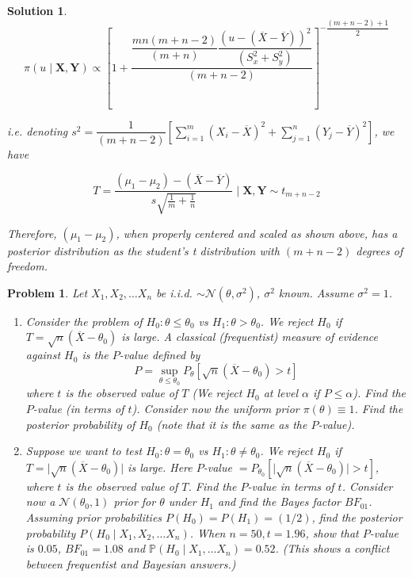 \documentclass[12pt]{article}
\theoremstyle{problemstyle}
\newtheorem{pbm}{Problem}
\newtheorem*{solution*}{Solution}
\newenvironment{problem}{
\begin{tcolorbox}[colback=green!10!white,colframe=black!75!black, parbox = false]\begin{pbm} }{\end{pbm}\end{tcolorbox} }
\newcommand{\prob}{\mathbb{P}}
\newcommand{\normal}{\mathcal{N}}
\begin{document}
\begin{solution*}
    $$
    \pi(u \mid \boldsymbol{X}, \boldsymbol{Y}) \propto \left[ 1 + \dfrac{ \dfrac{mn(m+n-2)}{(m+n)}\dfrac{(u - (\overline{X} - \overline{Y}))^2}{(S_x^2 + S_y^2)} }{(m+n-2)}\right]^{-\dfrac{(m+n-2)+1}{2}}
    $$

    i.e. denoting $s^2 = \dfrac{1}{(m+n-2)} \left[ \sum_{i=1}^m (X_i - \overline{X})^2 + \sum_{j=1}^n (Y_j - \overline{Y})^2 \right]$, we have 

    $$
    T = \dfrac{(\mu_1 - \mu_2) - (\overline{X} - \overline{Y})}{s \sqrt{\frac{1}{m} + \frac{1}{n} }} \mid \boldsymbol{X}, \boldsymbol{Y} \sim t_{m+n-2} 
    $$

    Therefore, $(\mu_1 - \mu_2)$, when properly centered and scaled as shown above, has a posterior distribution as the student's t distribution with $(m+n-2)$ degrees of freedom.

\end{solution*}
\pagebreak



\begin{problem}
    Let $X_1, X_2, \dots X_n$ be i.i.d. $\sim \normal(\theta, \sigma^2)$, $\sigma^2$ known. Assume $\sigma^2 = 1$. 
    \begin{enumerate}
        \item[(a)] Consider the problem of $H_0 : \theta \leq \theta_0$ vs $H_1 : \theta > \theta_0$. We reject $H_0$ if $T = \sqrt{n}(\overline{X} - \theta_0)$ is large. A classical (frequentist) measure of evidence against $H_0$ is the $P$-value defined by 
        $$
        P = \sup_{\theta \leq \theta_0} P_{\theta}[\sqrt{n}(\overline{X} - \theta_0) > t]
        $$
        where $t$ is the observed value of $T$ (We reject $H_0$ at level $\alpha$ if $P \leq \alpha$). Find the $P$-value (in terms of $t$).
        Consider now the uniform prior $\pi(\theta) \equiv 1$. Find the posterior probability of $H_0$ (note that it is the same as the $P$-value).
        \item[(b)] Suppose we want to test $H_0: \theta = \theta_0$ vs $H_1 : \theta \neq \theta_0$. We reject $H_0$ if $T = \vert \sqrt{n} (\overline{X} - \theta_0) \vert$ is large. Here $P$-value $= P_{\theta_0}[\vert \sqrt{n} (\overline{X} - \theta_0) \vert > t]$, where $t$ is the observed value of $T$. Find the $P$-value in terms of $t$.
        Consider now a $\normal(\theta_0, 1)$ prior for $\theta$ under $H_1$ and find the Bayes factor $BF_{01}$. Assuming prior probabilities $P(H_0) = P(H_1) = (1/2)$, find the posterior probability $P(H_0 \mid X_1, X_2, \dots X_n)$. When $n = 50, t = 1.96$, show that $P$-value is $0.05$, $BF_{01} = 1.08$ and $\prob(H_0 \mid X_1, \dots X_n) = 0.52$. (This shows a conflict between frequentist and Bayesian answers.) 
    \end{enumerate}
\end{problem}
\end{document}
